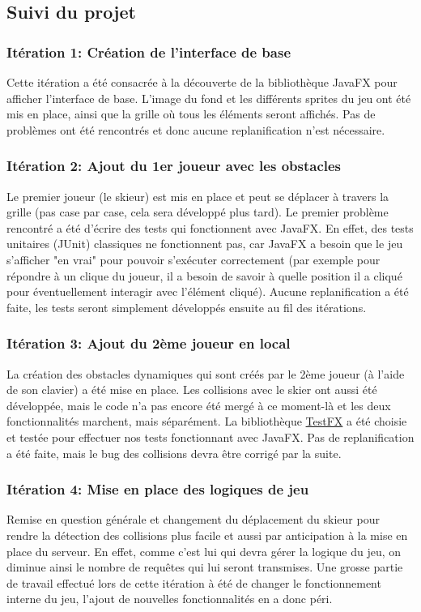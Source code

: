 \documentclass[a4paper,12pt]{article}
\begin{document}
	\subsection{Suivi du projet}
	
	\subsubsection{Itération 1: Création de l'interface de base}
	Cette itération a été consacrée à la découverte de la bibliothèque JavaFX pour afficher l'interface de base. L'image du fond et les différents sprites du jeu ont été mis en place, ainsi que la grille où tous les éléments seront affichés. Pas de problèmes ont été rencontrés et donc aucune replanification n'est nécessaire.
	
	\subsubsection{Itération 2: Ajout du 1er joueur avec les obstacles}
	Le premier joueur (le skieur) est mis en place et peut se déplacer à travers la grille (pas case par case, cela sera développé plus tard). Le premier problème rencontré a été d'écrire des tests qui fonctionnent avec JavaFX. En effet, des tests unitaires (JUnit) classiques ne fonctionnent pas, car JavaFX a besoin que le jeu s'afficher "en vrai" pour pouvoir s'exécuter correctement (par exemple pour répondre à un clique du joueur, il a besoin de savoir à quelle position il a cliqué pour éventuellement interagir avec l'élément cliqué). Aucune replanification a été faite, les tests seront simplement développés ensuite au fil des itérations.
	
	\subsubsection{Itération 3: Ajout du 2ème joueur en local}
	La création des obstacles dynamiques qui sont créés par le 2ème joueur (à l'aide de son clavier) a été mise en place. Les collisions avec le skier ont aussi été développée, mais le code n'a pas encore été mergé à ce moment-là et les deux fonctionnalités marchent, mais séparément. La bibliothèque \href{https://github.com/TestFX/TestFX}{TestFX} a été choisie et testée pour effectuer nos tests fonctionnant avec JavaFX. Pas de replanification a été faite, mais le bug des collisions devra être corrigé par la suite.
	
	\subsubsection{Itération 4: Mise en place des logiques de jeu}
	Remise en question générale et changement du déplacement du skieur pour rendre la détection des collisions plus facile et aussi par anticipation à la mise en place du serveur. En effet, comme c'est lui qui devra gérer la logique du jeu, on diminue ainsi le nombre de requêtes qui lui seront transmises. Une grosse partie de travail effectué lors de cette itération à été de changer le fonctionnement interne du jeu, l'ajout de nouvelles fonctionnalités en a donc péri.
	
\end{document}
